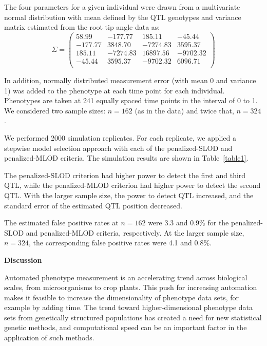 \documentclass[12pt,letterpaper]{article}
\begin{document}
The four parameters for a given individual were drawn from a
multivariate normal distribution with mean defined by the QTL
genotypes and variance matrix estimated from the root
tip angle data as:
\begin{equation*}
  \Sigma = \begin{pmatrix}
 58.99 &  -177.77 &  185.11 &  -45.44 \\
 -177.77 & 3848.70 & -7274.83 & 3595.37 \\
   185.11& -7274.83& 16897.56 &-9702.32\\
   -45.44&  3595.37& -9702.32 & 6096.71 \\
  \end{pmatrix}
\end{equation*}

In addition, normally distributed measurement error (with mean 0 and
variance 1) was added to the phenotype at each time point for each
individual. Phenotypes are taken at 241 equally spaced time points in
the interval of 0 to 1. We considered two sample sizes: $n=162$ (as in
the \citet{Moore2013} data) and twice that, $n=324$.

We performed 2000 simulation replicates. For each replicate, we
applied a stepwise model selection approach with each of the
penalized-SLOD and penalized-MLOD criteria.
The simulation results are shown in Table~\ref{table1}.

The penalized-SLOD criterion had higher power to detect the first and
third QTL, while the penalized-MLOD criterion had higher power to
detect the second QTL.
With the larger sample size, the power to detect QTL increased,
and the standard error of the estimated QTL position decreased.

The estimated false positive rates at $n=162$ were 3.3 and 0.9\% for
the penalized-SLOD and penalized-MLOD criteria, respectively. At the
larger sample size, $n=324$, the corresponding false positive rates
were 4.1 and 0.8\%.



\clearpage
\centerline{\sffamily \textbf{Discussion}}

Automated phenotype measurement is an accelerating trend across
biological scales, from microorganisms to crop plants. This push
for increasing automation makes it feasible to increase the
dimensionality of phenotype data sets, for example by adding
time. The trend toward higher-dimensional phenotype data sets from
genetically structured populations has created a need for new
statistical genetic methods, and computational speed can be an
important factor in the application of such methods.
\end{document}
